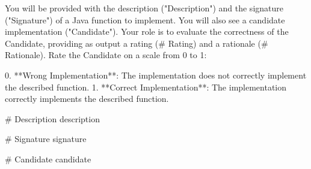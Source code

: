You will be provided with the description ("Description") and the signature ("Signature") of a Java function to implement. You will also see a candidate implementation ("Candidate"). Your role is to evaluate the correctness of the Candidate, providing as output a rating (# Rating) and a rationale (# Rationale). Rate the Candidate on a scale from 0 to 1:

0. **Wrong Implementation**: The implementation does not correctly implement the described function.
1. **Correct Implementation**: The implementation correctly implements the described function.

# Description
{description}

# Signature
{signature}

# Candidate
{candidate}